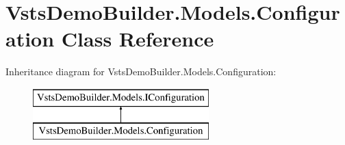 \hypertarget{class_vsts_demo_builder_1_1_models_1_1_configuration}{}\section{Vsts\+Demo\+Builder.\+Models.\+Configuration Class Reference}
\label{class_vsts_demo_builder_1_1_models_1_1_configuration}
Inheritance diagram for Vsts\+Demo\+Builder.\+Models.\+Configuration\+:\begin{figure}[H]
\begin{center}
\leavevmode
\includegraphics[height=2.000000cm]{class_vsts_demo_builder_1_1_models_1_1_configuration}
\end{center}
\end{figure}
